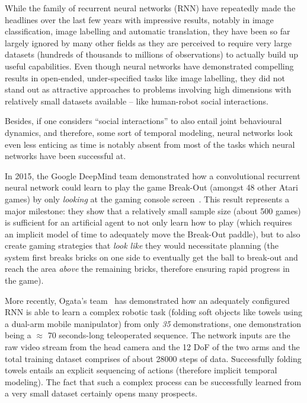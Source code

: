 \documentclass{article}
\begin{document}
While the family of recurrent neural networks (RNN) have repeatedly made the
headlines over the last few years with impressive results, notably in image
classification, image labelling and automatic translation, they have been so far 
largely ignored by  many other fields as they are perceived to require very
large datasets (hundreds of thousands to millions of observations) to actually
build up useful capabilities. Even though neural networks have demonstrated
compelling results in open-ended, under-specified tasks like image labelling, they
did not stand out as attractive approaches to problems involving high dimensions
with relatively small datasets available -- like human-robot social
interactions.

Besides, if one considers ``social interactions'' to also entail joint
behavioural dynamics, and therefore, some sort of temporal modeling, neural
networks look even less enticing as time is notably absent from most of the
tasks which neural networks have been successful at.

In 2015, the Google DeepMind team demonstrated how a convolutional
recurrent neural network could learn to play the game Break-Out (amongst
48 other Atari games) by only \emph{looking} at the gaming console
screen~\cite{mnih2015human}. This result represents a major milestone: they show
that a relatively small sample size (about 500 games) is sufficient for an 
artificial agent to not only learn how to play (which requires an implicit model 
of time to adequately move the Break-Out paddle), but to also create gaming 
strategies that \emph{look like} they would necessitate planning (the system first
breaks bricks on one side to eventually get the ball to break-out and reach the area
\emph{above} the remaining bricks, therefore ensuring rapid progress in the
game).

More recently, Ogata's team~\cite{yang2017repeatable} has demonstrated how an
adequately configured RNN is able to learn a complex robotic task (folding soft
objects like towels using a dual-arm mobile manipulator) from only \emph{35}
demonstrations, one demonstration being a $\approx$ 70 seconds-long teleoperated
sequence. The network inputs are the raw video stream from the head camera and the
12 DoF of the two arms and the total training dataset comprises of about 28000
steps of data. Successfully folding towels entails an explicit sequencing of
actions (therefore implicit temporal modeling). The fact that such a complex
process can be successfully learned from a very small dataset certainly opens
many prospects.
\end{document}

